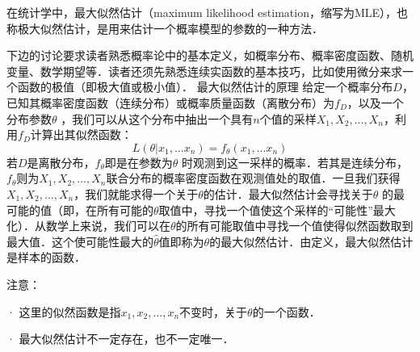 \begin{issues}
\issueTODO
\end{issues}
在统计学中，最大似然估计（maximum likelihood estimation，缩写为MLE），也称极大似然估计，是用来估计一个概率模型的参数的一种方法．

下边的讨论要求读者熟悉概率论中的基本定义，如概率分布、概率密度函数、随机变量、数学期望等．读者还须先熟悉连续实函数的基本技巧，比如使用微分来求一个函数的极值（即极大值或极小值）．
最大似然估计的原理
给定一个概率分布$D $，已知其概率密度函数（连续分布）或概率质量函数（离散分布）为$f_D $，以及一个分布参数$\theta $ ，我们可以从这个分布中抽出一个具有$n$个值的采样$X_{1},X_{2},... ,X_{n} $，利用$f_D$计算出其似然函数：
$$
L(\theta|x_1,...x_n ) = f_{\theta }(x_1,...x_n )
$$
若$D$是离散分布，$f_{\theta }$即是在参数为$\theta$ 时观测到这一采样的概率．若其是连续分布，$f_{\theta }$则为$X_{1},X_{2},... ,X_{n} $联合分布的概率密度函数在观测值处的取值．一旦我们获得$X_{1},X_{2},... ,X_{n} $，我们就能求得一个关于$\theta $的估计．最大似然估计会寻找关于$\theta$ 的最可能的值（即，在所有可能的$\theta $取值中，寻找一个值使这个采样的“可能性”最大化）．从数学上来说，我们可以在$\theta $的所有可能取值中寻找一个值使得似然函数取到最大值．这个使可能性最大的$\widehat{\theta}$值即称为$\theta $的最大似然估计．由定义，最大似然估计是样本的函数．

注意：

· 这里的似然函数是指$x_1,x_2,\ldots,x_n$不变时，关于$\theta $的一个函数．

· 最大似然估计不一定存在，也不一定唯一．
